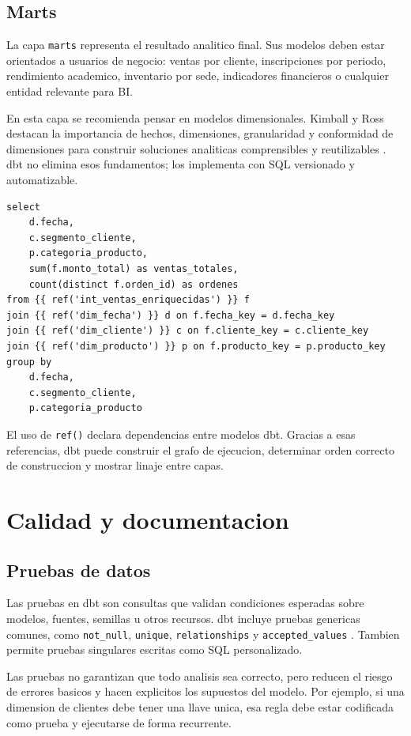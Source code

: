 \documentclass[12pt]{article}
\begin{document}
\subsection{Marts}
La capa \texttt{marts} representa el resultado analitico final. Sus modelos deben estar orientados a usuarios de negocio: ventas por cliente, inscripciones por periodo, rendimiento academico, inventario por sede, indicadores financieros o cualquier entidad relevante para BI.

En esta capa se recomienda pensar en modelos dimensionales. Kimball y Ross destacan la importancia de hechos, dimensiones, granularidad y conformidad de dimensiones para construir soluciones analiticas comprensibles y reutilizables \cite{kimball_dw}. dbt no elimina esos fundamentos; los implementa con SQL versionado y automatizable.

\begin{lstlisting}[style=sql, caption={Ejemplo conceptual de mart analitico}]
select
    d.fecha,
    c.segmento_cliente,
    p.categoria_producto,
    sum(f.monto_total) as ventas_totales,
    count(distinct f.orden_id) as ordenes
from {{ ref('int_ventas_enriquecidas') }} f
join {{ ref('dim_fecha') }} d on f.fecha_key = d.fecha_key
join {{ ref('dim_cliente') }} c on f.cliente_key = c.cliente_key
join {{ ref('dim_producto') }} p on f.producto_key = p.producto_key
group by
    d.fecha,
    c.segmento_cliente,
    p.categoria_producto
\end{lstlisting}

El uso de \texttt{ref()} declara dependencias entre modelos dbt. Gracias a esas referencias, dbt puede construir el grafo de ejecucion, determinar orden correcto de construccion y mostrar linaje entre capas.

\section{Calidad y documentacion}
\subsection{Pruebas de datos}
Las pruebas en dbt son consultas que validan condiciones esperadas sobre modelos, fuentes, semillas u otros recursos. dbt incluye pruebas genericas comunes, como \texttt{not\_null}, \texttt{unique}, \texttt{relationships} y \texttt{accepted\_values} \cite{dbt_data_tests}. Tambien permite pruebas singulares escritas como SQL personalizado.

Las pruebas no garantizan que todo analisis sea correcto, pero reducen el riesgo de errores basicos y hacen explicitos los supuestos del modelo. Por ejemplo, si una dimension de clientes debe tener una llave unica, esa regla debe estar codificada como prueba y ejecutarse de forma recurrente.
\end{document}

